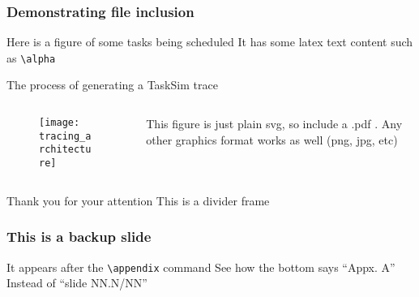 \documentclass[aspectratio=169,c,12pt]{beamer}
\begin{document}
\begin{frame}[fragile]
	\frametitle{Demonstrating file inclusion}
	\begin{block}{Here is a figure of some tasks being scheduled}
		It has some latex text content such as \verb|\alpha|
		\begin{figure}[h!]
		\centering
		\tiny %
		
		\end{figure}
	\end{block}
	\vspace{-1em}\pause
	\begin{block}{The process of generating a TaskSim trace}
		\begin{columns}
		\begin{column}{0.3\linewidth}
			\begin{figure}[h!]
			\centering
			\texttt{[image: tracing\_architecture]}
			\end{figure}
		\end{column}
		\begin{column}{0.5\linewidth}
			This figure is just plain svg, so include a .pdf . Any other graphics format works as well (png, jpg, etc)
		\end{column}
		\end{columns}
	\end{block}
\end{frame}

\begin{divider}
	\begin{block}{Thank you for your attention}
		This is a divider frame
	\end{block}
\end{divider}

\appendix

\begin{frame}
	\frametitle{This is a backup slide}
	\begin{block}{It appears after the \texttt{\textbackslash appendix} command}
		See how the bottom says ``Appx. A'' Instead of ``slide NN.N/NN''
	\end{block}
\end{frame}
\end{document}
